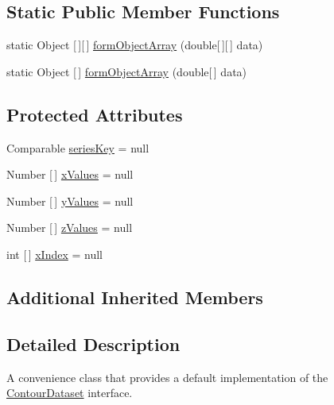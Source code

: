 \subsection*{Static Public Member Functions}
\begin{DoxyCompactItemize}
\item 
static Object \mbox{[}$\,$\mbox{]}\mbox{[}$\,$\mbox{]} \mbox{\hyperlink{classorg_1_1jfree_1_1data_1_1contour_1_1_default_contour_dataset_a32ef37bc23cc8511e06a4710661414b4}{form\+Object\+Array}} (double\mbox{[}$\,$\mbox{]}\mbox{[}$\,$\mbox{]} data)
\item 
static Object \mbox{[}$\,$\mbox{]} \mbox{\hyperlink{classorg_1_1jfree_1_1data_1_1contour_1_1_default_contour_dataset_ad48e346a3719bbf2ba16f935ebe567a5}{form\+Object\+Array}} (double\mbox{[}$\,$\mbox{]} data)
\end{DoxyCompactItemize}
\subsection*{Protected Attributes}
\begin{DoxyCompactItemize}
\item 
Comparable \mbox{\hyperlink{classorg_1_1jfree_1_1data_1_1contour_1_1_default_contour_dataset_a2a44f861cc9da126f4969b4b80c35ad6}{series\+Key}} = null
\item 
Number \mbox{[}$\,$\mbox{]} \mbox{\hyperlink{classorg_1_1jfree_1_1data_1_1contour_1_1_default_contour_dataset_a301054c40673d316f7a000d18a46ee9d}{x\+Values}} = null
\item 
Number \mbox{[}$\,$\mbox{]} \mbox{\hyperlink{classorg_1_1jfree_1_1data_1_1contour_1_1_default_contour_dataset_ae35836f22456a24fa4699a4a92c2eff2}{y\+Values}} = null
\item 
Number \mbox{[}$\,$\mbox{]} \mbox{\hyperlink{classorg_1_1jfree_1_1data_1_1contour_1_1_default_contour_dataset_aa0a45a298e7fff4748123daab5ee36be}{z\+Values}} = null
\item 
int \mbox{[}$\,$\mbox{]} \mbox{\hyperlink{classorg_1_1jfree_1_1data_1_1contour_1_1_default_contour_dataset_a885ed4cff9dec60518b72609a543e1e5}{x\+Index}} = null
\end{DoxyCompactItemize}
\subsection*{Additional Inherited Members}


\subsection{Detailed Description}
A convenience class that provides a default implementation of the \mbox{\hyperlink{interfaceorg_1_1jfree_1_1data_1_1contour_1_1_contour_dataset}{Contour\+Dataset}} interface.

